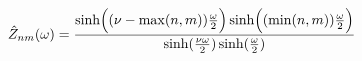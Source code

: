 \begin{equation}
\hat Z_{nm}(\omega)= { \sinh \Bigl (( \nu - \max(n,m)){\omega
\over 2} \Bigr ) \sinh \Bigl ((\min(n,m)){\omega \over 2} \Bigr )
\over \sinh ({\nu \omega \over 2}) \sinh({\omega \over 2})}\\
\label{Z}
\end{equation}

